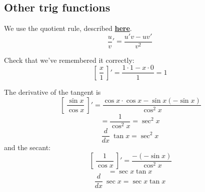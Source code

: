 \documentclass[11pt, oneside]{article}
\begin{document}
\subsection*{Other trig functions}

We use the quotient rule, described \hyperlink{quotient_rule}{\textbf{here}}.
\[ \frac{u}{v}' = \frac{u'v - uv'}{v^2} \]

Check that we've remembered it correctly:
\[ [ \ \frac{x}{1} \ ] ' = \frac{1 \cdot 1 - x \cdot 0}{1} = 1 \]

The derivative of the tangent is
\[ \ [ \ \frac{\sin x}{\cos x} \ ]' = \frac{\cos x \cdot \cos x - \sin x (- \sin x)}{\cos^2 x} \]
\[ = \frac{1}{\cos^2 x} = \sec^2 x \]
\[ \frac{d}{dx} \ \tan x = \sec^2 x \] 
and the secant:
\[ \ [ \ \frac{1}{\cos x} \ ] ' =  \frac{-(- \sin x)}{\cos^2 x}  \]
\[ = \sec x \tan x \]
\[ \frac{d}{dx} \ \sec x =\sec x \tan x \] 
\end{document}
